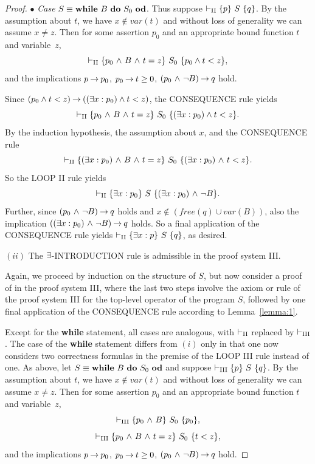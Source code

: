 \documentclass[runningheads]{llncs}       %
\begin{document}
\begin{proof}
\vspace{2mm}

\NI
$\bullet$ \emph{Case} $S \equiv \mbox{$\mbox{{\bf while}\ } {B}\ \mbox{{\bf do}\ } {S_0}\ \mbox{{\bf od}}$}$.
Thus suppose $\vdash_{\rm{II}} \mbox{$\{{p}\}\ {S}\ \{{q}\}$}$.
By the assumption about $t$, we have
$x \not \in var(t)$ and without loss of generality we can assume $x \neq z$.
Then for some assertion $p_{0}$ and an appropriate bound function $t$ and
variable~$z$,
\[
 \vdash_{\rm{II}} \mbox{$\{{p_{0} \mbox{$\ \wedge\ $} B \mbox{$\ \wedge\ $} t = z}\}\ {S_0}\ \{{p_0\wedge t < z}\}$},
\]
and the implications
$p \mbox{$\:\rightarrow\:$} p_{0}$, $p_{0} \mbox{$\:\rightarrow\:$} t \ge 0$,  $(p_{0} \mbox{$\ \wedge\ $} \neg B) \mbox{$\:\rightarrow\:$} q$
hold.

Since $(p_0\wedge t<z) \mbox{$\:\rightarrow\:$} ((\mbox{$\exists$} x: p_0)\wedge t<z) $, the CONSEQUENCE rule yields
\[
 \vdash_{\rm{II}} \mbox{$\{{p_{0} \mbox{$\ \wedge\ $} B \mbox{$\ \wedge\ $} t=z}\}\ {S_0}\ \{{(\mbox{$\exists$} x: p_{0})\wedge t<z }\}$}.
\]
By the induction hypothesis, the assumption about $x$,
and the CONSEQUENCE rule 
\[
 \vdash_{\rm{II}} \mbox{$\{{(\mbox{$\exists$} x:p_0) \mbox{$\ \wedge\ $} B \mbox{$\ \wedge\ $} t = z}\}\ {S_0}\ \{{(\mbox{$\exists$} x:p_0)\mbox{$\ \wedge\ $} t < z}\}$}.
\]
So the LOOP II rule yields 
\[
 \vdash_{\rm{II}} \mbox{$\{{\mbox{$\exists$} x:p_0}\}\ {S}\ \{{(\mbox{$\exists$} x:p_0) \mbox{$\ \wedge\ $} \neg B}\}$}.
\]
Further, since $(p_{0} \mbox{$\ \wedge\ $} \neg B) \mbox{$\:\rightarrow\:$} q$ holds and
$x \not\in (\mathit{free(q)} \cup var(B))$, also the implication
$((\mbox{$\exists$} x:p_0) \mbox{$\ \wedge\ $} \neg B) \mbox{$\:\rightarrow\:$} q$ holds.  So a final application of the
CONSEQUENCE rule yields $\vdash_{\rm{II}} \mbox{$\{{\mbox{$\exists$} x:p}\}\ {S}\ \{{q}\}$}$, as
desired.

\vspace{3mm}

\noindent
$(ii)$ The $\mbox{$\exists$}$-{\rm INTRODUCTION} rule is admissible in the proof system {\rm III}.

Again, we proceed by induction on the structure of $S$,
but now consider a proof of  in the proof system \rm{III}, where 
the last two steps involve the axiom or rule of the proof system \rm{III} 
for the top-level operator of the program $S$, 
followed by one final application of the CONSEQUENCE rule
according to Lemma~\ref{lemma:1}.

Except for the \textbf{while} statement, all cases are analogous, 
with $\vdash_{\rm{II}}$ replaced by $\vdash_{\rm{III}}$. 
The case of the \textbf{while} statement differs from $(i)$ only 
in that one now considers two correctness formulas in the premise 
of the LOOP III rule instead of one. 
As above, let $S \equiv \mbox{$\mbox{{\bf while}\ } {B}\ \mbox{{\bf do}\ } {S_0}\ \mbox{{\bf od}}$}$ and
suppose $\vdash_{\rm{III}} \mbox{$\{{p}\}\ {S}\ \{{q}\}$}$.
By the assumption about $t$, we have
$x \not \in var(t)$ and without loss of generality we can assume $x \neq z$.
Then for some assertion $p_{0}$ and an appropriate bound function $t$ and
variable~$z$,
\[
 \vdash_{\rm{III}} \mbox{$\{{p_{0} \mbox{$\ \wedge\ $} B}\}\ {S_0}\ \{{p_{0}}\}$},
\]
\[
 \vdash_{\rm{III}} \mbox{$\{{p_{0} \mbox{$\ \wedge\ $} B \mbox{$\ \wedge\ $} t = z}\}\ {S_0}\ \{{t < z}\}$},
\]
and the implications
$p \mbox{$\:\rightarrow\:$} p_{0}$, $p_{0} \mbox{$\:\rightarrow\:$} t \ge 0$,  $(p_{0} \mbox{$\ \wedge\ $} \neg B) \mbox{$\:\rightarrow\:$} q$
hold.


\end{proof}
\end{document}
